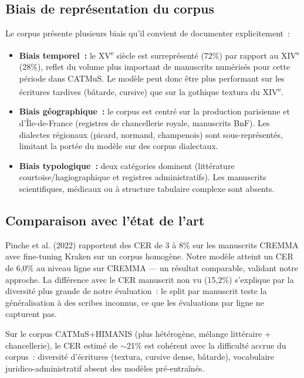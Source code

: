 \documentclass[11pt,a4paper]{article}
\begin{document}
\subsection{Biais de représentation du corpus}

Le corpus présente plusieurs biais qu'il convient de documenter explicitement~:

\begin{itemize}[leftmargin=*, itemsep=2pt]
\item \textbf{Biais temporel~:} le XV\textsuperscript{e} siècle est surreprésenté (72\%) par rapport au XIV\textsuperscript{e} (28\%), reflet du volume plus important de manuscrits numérisés pour cette période dans CATMuS. Le modèle peut donc être plus performant sur les écritures tardives (bâtarde, cursive) que sur la gothique textura du XIV\textsuperscript{e}.
\item \textbf{Biais géographique~:} le corpus est centré sur la production parisienne et d'Île-de-France (registres de chancellerie royale, manuscrits BnF). Les dialectes régionaux (picard, normand, champenois) sont sous-représentés, limitant la portée du modèle sur des corpus dialectaux.
\item \textbf{Biais typologique~:} deux catégories dominent (littérature courtoise/hagiographique et registres administratifs). Les manuscrits scientifiques, médicaux ou à structure tabulaire complexe sont absents.
\end{itemize}

\subsection{Comparaison avec l'état de l'art}

Pinche et al. (2022) rapportent des CER de 3 à 8\% sur les manuscrits CREMMA avec fine-tuning Kraken sur un corpus homogène. Notre modèle atteint un CER de 6,0\% au niveau ligne sur CREMMA --- un résultat comparable, validant notre approche. La différence avec le CER manuscrit non vu (15,2\%) s'explique par la diversité plus grande de notre évaluation~: le split par manuscrit teste la généralisation à des scribes inconnus, ce que les évaluations par ligne ne capturent pas.

Sur le corpus CATMuS+HIMANIS (plus hétérogène, mélange littéraire + chancellerie), le CER estimé de $\sim$21\% est cohérent avec la difficulté accrue du corpus~: diversité d'écritures (textura, cursive dense, bâtarde), vocabulaire juridico-administratif absent des modèles pré-entraînés.
\end{document}
